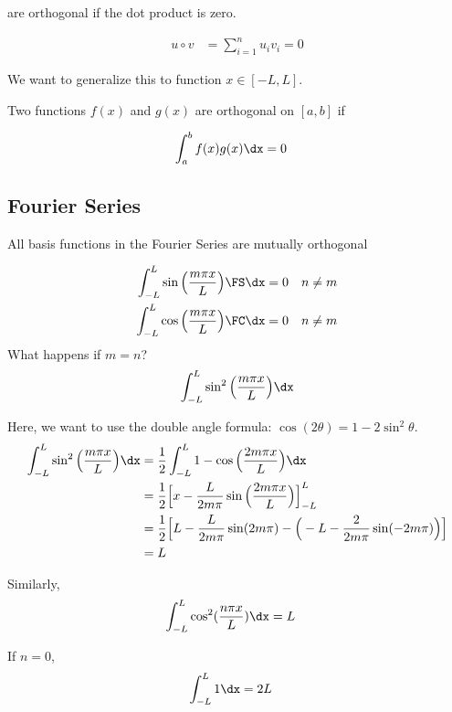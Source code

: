 are orthogonal if the dot product is zero.

\begin{align}
  u \circ v & = \sum^n_{i = 1} u_i v_i = 0
\end{align}

We want to generalize this to function $x \in [-L, L]$.

\dfn Two functions $f(x)$ and $g(x)$ are orthogonal on $[a, b]$ if

\begin{align}
  \int^b_a f(x)g(x) \dx & = 0
\end{align}

\subsection{Fourier Series}

\thm All basis functions in the Fourier Series are mutually orthogonal

\begin{align}
  \int^L_{-L} \sin\Big(\frac{m \pi x}{L}\Big) \FS \dx & = 0 \quad n \neq m\\
  \int^L_{-L} \cos\Big(\frac{m \pi x}{L}\Big) \FC \dx & = 0 \quad n \neq m
\end{align}
What happens if $m = n$?
\begin{align}
  \int^L_{-L} \sin^2\Big( \frac{m \pi x}{L} \Big) \dx
\end{align}

Here, we want to use the double angle formula:
$\cos(2\theta) = 1 - 2\sin^2 \theta$.
%
\begin{align}
  \int^L_{-L} \sin^2\Big( \frac{m \pi x}{L} \Big) \dx & =
  \frac{1}{2} \int^L_{-L} 1 - \cos\Big(\frac{2 m \pi x}{L}\Big) \dx\\ & =
  \frac{1}{2} \Big[ x - \frac{L}{2 m \pi}
  \sin\Big(\frac{2 m \pi x}{L}\Big)\Big]^L_{-L}\\ & =
  \frac{1}{2} \Big[L - \frac{L}{2 m \pi}
  \sin(2 m \pi) - \Big(-L - \frac{2}{2 m \pi} \sin(-2 m \pi)\Big)\Big]\\ & =
  L
\end{align}


Similarly,
%
\begin{align}
  \int^L_{-L} \cos^2 (\frac{n\pi x}{L}) \dx & = L
\end{align}

If $n = 0$,
%
\begin{align}
  \int^L_{-L} 1 \dx & = 2L
\end{align}

